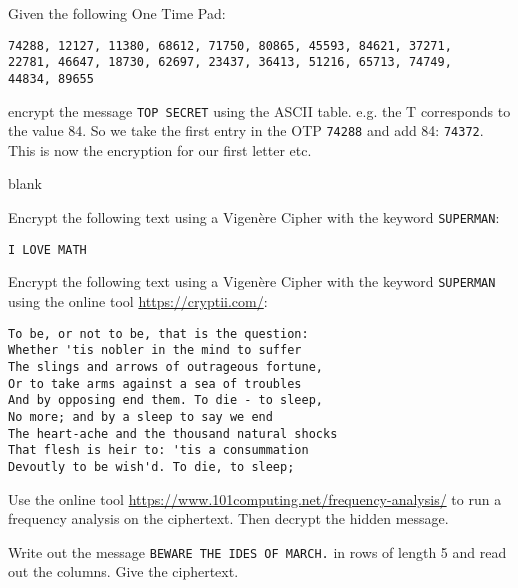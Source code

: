 \documentclass[11pt,a4paper]{report}
\begin{document}
\begin{ex}
Given the following One Time Pad: 
\begin{verbatim}
74288, 12127, 11380, 68612, 71750, 80865, 45593, 84621, 37271,
22781, 46647, 18730, 62697, 23437, 36413, 51216, 65713, 74749,
44834, 89655
\end{verbatim}
encrypt the message \verb|TOP SECRET| using the ASCII table. e.g. the T corresponds to the value $84$. So we take the first entry in the OTP \verb|74288| and add 84: \verb|74372|. This is now the encryption for our first letter etc.
\end{ex}

\begin{ex}
blank
\end{ex}


\begin{ex}
Encrypt the following text using a Vigenère Cipher with the keyword \verb|SUPERMAN|:
\begin{verbatim}
I LOVE MATH
\end{verbatim}

\end{ex}

\begin{ex}
Encrypt the following text using a Vigenère Cipher with the keyword \verb|SUPERMAN| using the online tool \url{https://cryptii.com/}:
\begin{verbatim}
To be, or not to be, that is the question:
Whether 'tis nobler in the mind to suffer
The slings and arrows of outrageous fortune,
Or to take arms against a sea of troubles
And by opposing end them. To die - to sleep,
No more; and by a sleep to say we end
The heart-ache and the thousand natural shocks
That flesh is heir to: 'tis a consummation
Devoutly to be wish'd. To die, to sleep;
\end{verbatim}
\end{ex}


\begin{ex}
Use the online tool \url{https://www.101computing.net/frequency-analysis/} to run a frequency analysis on the ciphertext. Then decrypt the hidden message.
\end{ex}



\begin{ex}
Write out the message
\verb|BEWARE THE IDES OF MARCH.|
in rows of length 5 and read out the columns. Give the ciphertext.
\end{ex}
\end{document}
